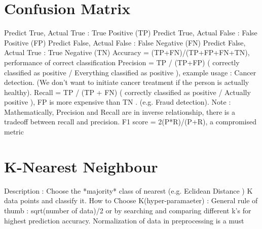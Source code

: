 \documentclass{article}
\begin{document}
\section{Confusion Matrix}
Predict True, Actual True : True Positive (TP) \newline
Predict True, Actual False : False Positive (FP) \newline
Predict False, Actual False : False Negative (FN)\newline 
Predict False, Actual True : True Negative (TN)\newline
\newline
\newline
Accuracy = (TP+FN)/(TP+FP+FN+TN), performance of correct classification
\newline
\newline
Precision = TP / (TP+FP)  ( correctly classified as positive / Everything classified as positive ), example usage : Cancer detection. (We don't want to initiate cancer treatment if the person is actually healthy).  
\newline
\newline
Recall = TP / (TP + FN) ( correctly classified as positive / Actually positive ), FP is more expensive than TN . (e.g. Fraud detection).
\newline
\newline
Note : Mathematically, Precision and Recall are in inverse relationship, there is a tradeoff between recall and precision.
\newline
\newline
F1 score = 2(P*R)/(P+R), a compromised metric

\section{K-Nearest Neighbour}
Description : Choose the *majority* class of nearest (e.g. Eclidean Distance ) K data points and classify it.  
\newline
How to Choose K(hyper-paramaeter) : General rule of thumb : sqrt(number of data)/2 or by searching and comparing different k's for highest prediction accuracy.
\newline 
Normalization of data in preprocessing is a must
\end{document}
